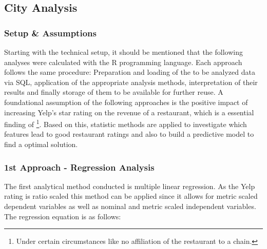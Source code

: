 \subsection{City Analysis}
\label{subsec:analysis}


\subsubsection{Setup \& Assumptions}
Starting with the technical setup, it should be mentioned that the following analyses were calculated with the R programming language. Each approach follows the same procedure: Preparation and loading of the to be analyzed data via SQL, application of the appropriate analysis methods, interpretation of their results and finally storage of them to be available for further reuse.\newline
A foundational assumption of the following approaches is the positive impact of increasing Yelp's star rating on the revenue of a restaurant, which is a essential finding of \cite{CaseOfYelp}\footnote{Under certain circumstances like no affiliation of the restaurant to a chain.}. Based on this, statistic methods are applied to investigate which features lead to good restaurant ratings and also to build a predictive model to find a optimal solution.


\subsubsection{1st Approach -  Regression Analysis}
The first analytical method conducted is multiple linear regression. As the Yelp rating is ratio scaled this method can be applied since it allows for metric scaled dependent variables as well as nominal and metric scaled independent variables. The regression equation is as follows:

